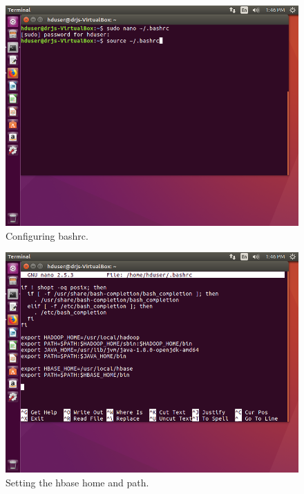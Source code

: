 \documentclass[a4paper,10pt]{article}
\begin{document}
\begin{figure}[h]
	\includegraphics[scale=0.33,center]{4.png}
	\caption{Configuring bashrc.}
	\label{fig:05}
\end{figure}

\begin{figure}[h]
	\includegraphics[scale=0.33,center]{5.png}
	\caption{Setting the hbase home and path.}
	\label{fig:06}
\end{figure}
\end{document}
